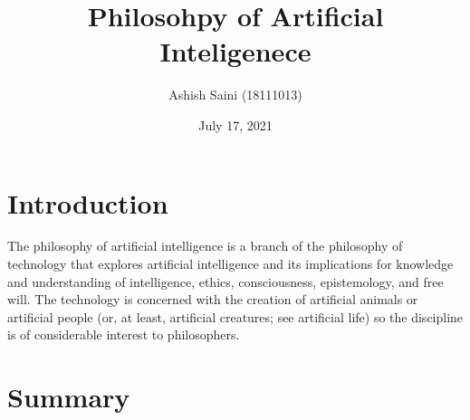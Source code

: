 \documentclass[12pt]{article}
\begin{document}
\title{Philosohpy of Artificial Inteligenece}
\author{Ashish Saini (18111013)}
\date{July 17, 2021}
\maketitle



\section{Introduction}
The philosophy of artificial intelligence is a branch of the philosophy of technology that explores artificial intelligence and its implications for knowledge and understanding of intelligence, ethics, consciousness, epistemology, and free will.
The technology is concerned with the creation of artificial animals or artificial people (or, at least, artificial creatures; see artificial life) so the discipline is of considerable interest to philosophers.

\section{Summary}
\end{document}
